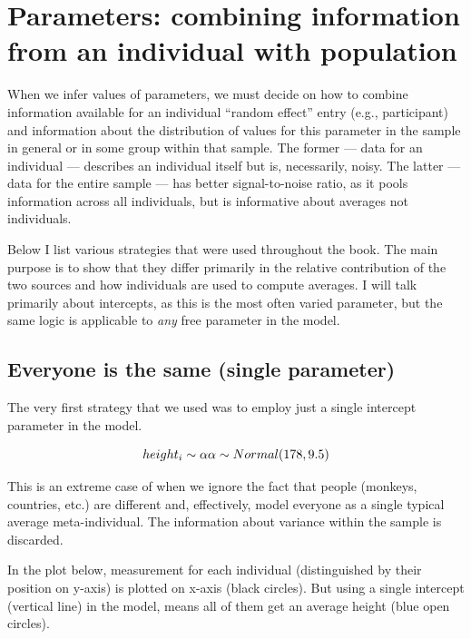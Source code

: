 \documentclass[
]{book}
\begin{document}
\hypertarget{parameters-combining-information-from-an-individual-with-population}{%
\chapter{Parameters: combining information from an individual with population}\label{parameters-combining-information-from-an-individual-with-population}}

When we infer values of parameters, we must decide on how to combine information available for an individual ``random effect'' entry (e.g., participant) and information about the distribution of values for this parameter in the sample in general or in some group within that sample. The former --- data for an individual --- describes an individual itself but is, necessarily, noisy. The latter --- data for the entire sample --- has better signal-to-noise ratio, as it pools information across all individuals, but is informative about averages not individuals.

Below I list various strategies that were used throughout the book. The main purpose is to show that they differ primarily in the relative contribution of the two sources and how individuals are used to compute averages. I will talk primarily about intercepts, as this is the most often varied parameter, but the same logic is applicable to \emph{any} free parameter in the model.

\hypertarget{everyone-is-the-same-single-parameter}{%
\section{Everyone is the same (single parameter)}\label{everyone-is-the-same-single-parameter}}

The very first strategy that we used was to employ just a single intercept parameter in the model.

\[height_i \sim \alpha\\
\alpha \sim Normal(178, 9.5)\]

This is an extreme case of when we ignore the fact that people (monkeys, countries, etc.) are different and, effectively, model everyone as a single typical average meta-individual. The information about variance within the sample is discarded.

In the plot below, measurement for each individual (distinguished by their position on y-axis) is plotted on x-axis (black circles). But using a single intercept (vertical line) in the model, means all of them get an average height (blue open circles).
\end{document}
